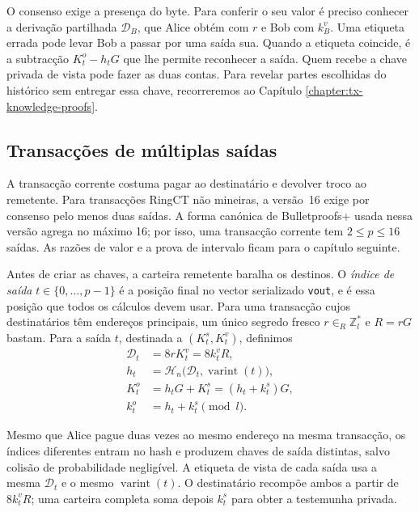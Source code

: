 O consenso exige a presença do byte. Para conferir o seu valor é preciso
conhecer a derivação partilhada \(\mathcal D_B\), que Alice obtém com \(r\)
e Bob com \(k_B^v\). Uma etiqueta errada pode levar Bob a passar por uma
saída sua. Quando a etiqueta coincide, é a subtracção \(K_t^o-h_tG\)
que lhe permite reconhecer a saída. Quem recebe a chave privada de vista
pode fazer as duas contas. Para revelar partes escolhidas do histórico
sem entregar essa chave, recorreremos ao Capítulo
\ref{chapter:tx-knowledge-proofs}.

\subsection{Transacções de múltiplas saídas}
\label{sec:multi_out_transactions}

%
A transacção corrente costuma pagar ao destinatário e devolver troco ao
remetente. Para transacções RingCT não mineiras, a versão~16 exige por
consenso pelo menos duas saídas. A forma canónica de Bulletproofs+ usada nessa
versão agrega no máximo 16; por isso, uma transacção corrente tem
\(2\leq p\leq16\) saídas. As razões de valor e a prova de intervalo ficam para
o capítulo seguinte.

%
Antes de criar as chaves, a carteira remetente baralha os destinos. O
\emph{índice de saída} \(t\in\{0,\ldots,p-1\}\) é a posição final no vector
serializado \texttt{vout}, e é essa posição que todos os cálculos devem usar.
Para uma transacção cujos destinatários têm endereços principais, um único
segredo fresco \(r\in_R\mathbb{Z}_l^*\) e \(R=rG\) bastam. Para a saída \(t\),
destinada a \((K_t^s,K_t^v)\), definimos
\begin{align*}
 \mathcal D_t&=8rK_t^v=8k_t^vR,\\
 h_t&=\mathcal H_n\bigl(\mathcal D_t,
             \operatorname{varint}(t)\bigr),\\
 K_t^o&=h_tG+K_t^s=(h_t+k_t^s)G,\\
 k_t^o&=h_t+k_t^s\pmod{l}.
\end{align*}


%
Mesmo que Alice pague duas vezes ao mesmo endereço na mesma transacção, os
índices diferentes entram no hash e produzem chaves de saída distintas,
salvo colisão de probabilidade negligível. A etiqueta de vista de cada saída
usa a mesma \(\mathcal D_t\) e o mesmo \(\operatorname{varint}(t)\). O
destinatário recompõe ambos a partir de \(8k_t^vR\); uma carteira completa soma
depois \(k_t^s\) para obter a testemunha privada.

